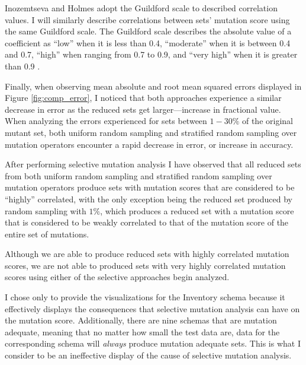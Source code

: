 \documentclass[conference]{IEEEtran}
\begin{document}
Inozemtseva and Holmes adopt the Guildford scale to described correlation values. I will similarly
describe correlations between sets' mutation score using the same Guildford scale.
The Guildford scale describes the absolute value of a coefficient as ``low'' when it is less than 0.4,
``moderate'' when it is between 0.4 and 0.7, ``high'' when ranging from 0.7 to 0.9, and ``very high''
when it is greater than 0.9 \cite{inozemtseva2014coverage}.

Finally, when observing mean absolute and root mean squared errors displayed in Figure \ref{fig:comp_error},
I noticed that both approaches experience a similar decrease in error as the reduced sets
get larger---increase in fractional value. When analyzing the errors experienced for sets between
$1 - 30\%$ of the original mutant set, both uniform random sampling and stratified random sampling over mutation operators
encounter a rapid decrease in error, or increase in accuracy.

After performing selective mutation analysis I have observed that all reduced sets from both
uniform random sampling and stratified random sampling over mutation operators produce sets with mutation scores that are
considered to be ``highly'' correlated, with the only exception
being the reduced set produced by random sampling with $1\%$, which produces a reduced set with a mutation score that is considered
to be weakly correlated to that of the mutation score of the entire set of mutations.

Although we are able to produce
reduced sets with highly correlated mutation scores, we are not able to produced sets with
very highly correlated mutation scores using either of the selective approaches begin analyzed.

I chose only to provide the visualizations for the Inventory schema because it effectively displays
the consequences that selective mutation analysis can have on the mutation score. Additionally,
there are nine schemas that are mutation adequate, meaning that no matter how small the test data
are, data for the corresponding schema will \textit{always} produce mutation adequate sets. This is what I consider
to be an ineffective display of the cause of selective mutation analysis.

\begin{figure*}[!ht]
\centering
{}
\hfil
{}
\caption{The errors for uniform random sampling and stratified random sampling over operators for the Inventory schema.}
\label{fig:comp_error}
\end{figure*}
\end{document}
